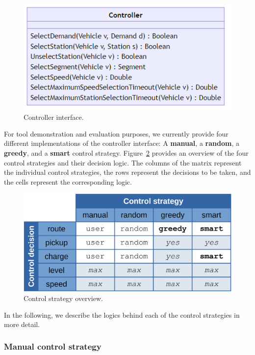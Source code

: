 \documentclass[10pt,twocolumn]{article}
\begin{document}
\begin{figure}[!ht]
    \centering
    \includegraphics[scale=0.4]{../../diagrams/controller/classes-minimal.png}
    \caption{Controller interface.}
    \label{fig:controller-interface}
\end{figure}

For tool demonstration and evaluation purposes, we currently provide four different implementations of the controller interface: A \textbf{manual}, a \textbf{random}, a \textbf{greedy}, and a \textbf{smart} control strategy.
Figure~\ref{fig:control-strategies} provides an overview of the four control strategies and their decision logic.
The columns of the matrix represent the individual control strategies, the rows represent the decisions to be taken, and the cells represent the corresponding logic.

\begin{figure}[!ht]
    \centering
    \includegraphics[width=0.8\columnwidth]{control_strategy_overview.png}
    \caption{Control strategy overview.}
    \label{fig:control-strategies}
\end{figure}

In the following, we describe the logics behind each of the control strategies in more detail.

\subsubsection*{Manual control strategy}
\label{sec:controller-manual}
\end{document}
